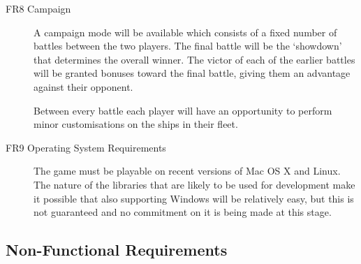 \begin{description}
	\item[FR8 Campaign] A campaign mode will be available which consists of a fixed number of battles between the two players.
	The final battle will be the `showdown' that determines the overall winner. The victor of each of
	the earlier battles will be granted bonuses toward the final battle, giving them an advantage against
	their opponent.

	Between every battle each player will have an opportunity to perform minor customisations on
	the ships in their fleet.

	\item[FR9 Operating System Requirements] The game must be playable on recent versions of Mac OS X and Linux. The nature of the libraries that are likely to be used for development make it possible that also supporting Windows will be relatively easy, but this is not guaranteed and no commitment on it is being made at this stage.


\end{description}

\subsection{Non-Functional Requirements}

